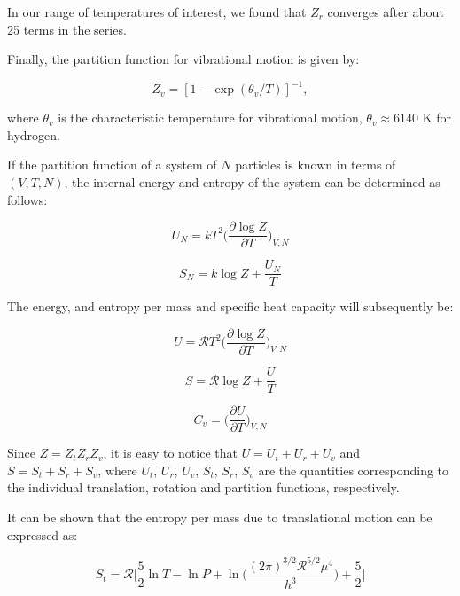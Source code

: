 \documentclass[apj]{emulateapj}
\begin{document}
In our range of temperatures of interest, we found that $Z_r$ converges after about 25 terms in the series.


Finally, the partition function for vibrational motion is given by:

\begin{equation}
\label{eq:Zv}
Z_v=[1-\exp{(\theta_v/T)}]^{-1},
\end{equation}

\noindent where $\theta_v$ is the characteristic temperature for vibrational motion, $\theta_v \approx 6140$ K for hydrogen. 

If the partition function of a system of $N$ particles is known in terms of $(V, T, N)$, the internal energy and entropy of the system can be determined as follows:

\begin{equation}
\label{eq:U}
U_N=k T^2 \Big(\frac{\partial \log{Z}}{\partial T}\Big)_{V, N}
\end{equation}

\begin{equation}
\label{eq:S}
S_N=k \log{Z} + \frac{U_N}{T}
\end{equation}

The energy, and entropy per mass and specific heat capacity will subsequently be:

\begin{equation}
\label{eq:u}
U=\mathcal{R} T^2 \Big(\frac{\partial \log{Z}}{\partial T}\Big)_{V, N}
\end{equation}

\begin{equation}
\label{eq:s}
S=\mathcal{R} \log{Z} + \frac{U}{T}
\end{equation}

\begin{equation}
\label{eq:cv}
C_v=\Big(\frac{\partial U}{\partial T}\Big)_{V, N}
\end{equation}


Since $Z=Z_t Z_r Z_v$, it is easy to notice that $U=U_t+U_r+U_v$ and $S=S_t+S_r+S_v$, where $U_t$, $U_r$, $U_v$, $S_t$, $S_r$, $S_v$ are the quantities corresponding to the individual translation, rotation and partition functions, respectively.

It can be shown that the entropy per mass due to translational motion can be expressed as:

\begin{equation}
\label{eq:st}
S_t=\mathcal{R} \Big[ \frac{5}{2} \ln{T} - \ln{P} + \ln \Big( \frac{(2 \pi)^{3/2} \mathcal{R}^{5/2} \mu^4}{h^3}\Big) +\frac{5}{2} \Big]
\end{equation}
\end{document}
